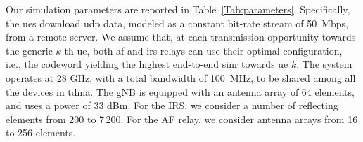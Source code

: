 


Our simulation parameters are reported in Table~\ref{Tab:parameters}.
Specifically, the \glspl{ue} download \gls{udp} data, modeled as a constant bit-rate stream of 50~Mbps, from a remote server. 
We assume that, at each transmission opportunity towards the generic $k$-th \gls{ue}, both \gls{af} and \gls{irs} relays can use their optimal configuration, i.e., the codeword yielding the highest end-to-end \gls{sinr} towards \gls{ue} $k$.
The system operates at 28 GHz, with a total bandwidth of 100~MHz, to be shared among all the devices in \gls{tdma}. 
The gNB is equipped with an antenna array of 64 elements, and uses a power of 33 dBm.
For the IRS, we consider a number of reflecting elements from 200 to 7\,200.
For the AF relay, we consider antenna arrays from 16 to 256 elements.%


